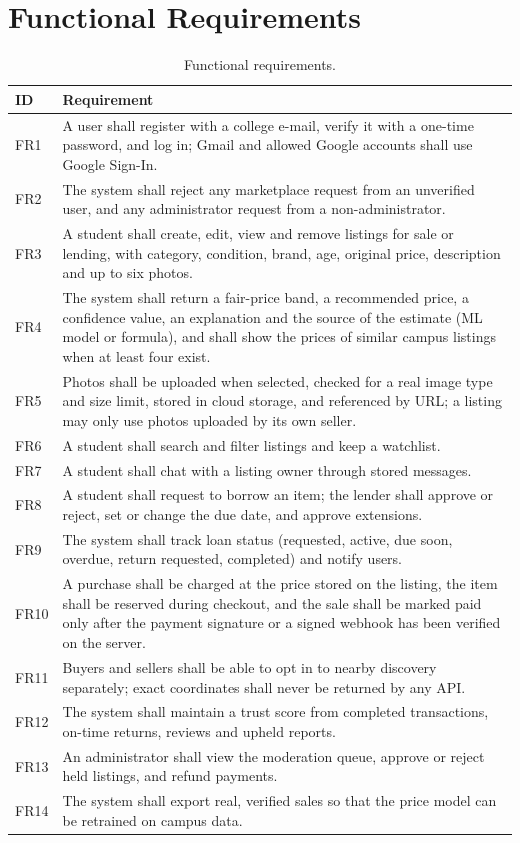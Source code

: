 \documentclass[11pt,letterpaper,oneside]{report}
\begin{document}
\section{Functional Requirements}
\begin{table}[H]
\centering
\caption{Functional requirements.}\label{tab:fr}
\small
\begin{tabularx}{\textwidth}{@{}L{1.0cm}X@{}}
\toprule
\textbf{ID} & \textbf{Requirement}\\
\midrule
FR1 & A user shall register with a college e-mail, verify it with a one-time password, and log in; Gmail and
allowed Google accounts shall use Google Sign-In.\\
FR2 & The system shall reject any marketplace request from an unverified user, and any administrator
request from a non-administrator.\\
FR3 & A student shall create, edit, view and remove listings for sale or lending, with category, condition,
brand, age, original price, description and up to six photos.\\
FR4 & The system shall return a fair-price band, a recommended price, a confidence value, an explanation
and the source of the estimate (ML model or formula), and shall show the prices of similar campus
listings when at least four exist.\\
FR5 & Photos shall be uploaded when selected, checked for a real image type and size limit, stored in cloud
storage, and referenced by URL; a listing may only use photos uploaded by its own seller.\\
FR6 & A student shall search and filter listings and keep a watchlist.\\
FR7 & A student shall chat with a listing owner through stored messages.\\
FR8 & A student shall request to borrow an item; the lender shall approve or reject, set or change the due
date, and approve extensions.\\
FR9 & The system shall track loan status (requested, active, due soon, overdue, return requested,
completed) and notify users.\\
FR10 & A purchase shall be charged at the price stored on the listing, the item shall be reserved during
checkout, and the sale shall be marked paid only after the payment signature or a signed webhook has
been verified on the server.\\
FR11 & Buyers and sellers shall be able to opt in to nearby discovery separately; exact coordinates shall
never be returned by any API.\\
FR12 & The system shall maintain a trust score from completed transactions, on-time returns, reviews and
upheld reports.\\
FR13 & An administrator shall view the moderation queue, approve or reject held listings, and refund
payments.\\
FR14 & The system shall export real, verified sales so that the price model can be retrained on campus
data.\\
\bottomrule
\end{tabularx}
\end{table}
\end{document}
